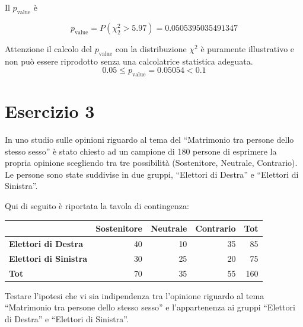 \documentclass[
  11pt,
]{book}
\theoremstyle{mytheoremstyle}
\theoremstyle{mydefstyle}
\newenvironment{sol}
  {
  \begin{tcolorbox}[enhanced,breakable,arc=0.1mm,boxrule=1pt,colback=white,colframe=iblue,
  title=\bf \fontfamily{lmss}\selectfont \hspace{.5 cm} Soluzione,drop fuzzy shadow]

}{
\end{tcolorbox}
  }
\begin{document}
\begin{sol}
Il \(p_{\text{value}}\) è

\[ p_{\text{value}} = P(\chi^2_{2}>5.97)=0.0505395035491347 \]

Attenzione il calcolo del \(p_\text{value}\) con la distribuzione \(\chi^2\) è puramente illustrativo e non può essere riprodotto senza una calcolatrice statistica adeguata.\[
 0.05 \leq p_\text{value}= 0.05054 < 0.1 
\]

\end{sol}

\section{Esercizio 3}\label{esercizio-3}

In uno studio sulle opinioni riguardo al tema del ``Matrimonio tra persone dello stesso sesso'' è stato chiesto ad un campione di 180 persone di esprimere la propria opinione scegliendo tra tre possibilità (Sostenitore, Neutrale, Contrario). Le persone sono state suddivise in due gruppi, ``Elettori di Destra'' e ``Elettori di Sinistra''.

Qui di seguito è riportata la tavola di contingenza:

\begin{table}[H]
\centering
\begin{tabular}{>{}lrrrr}
\toprule
  & Sostenitore & Neutrale & Contrario & Tot\\
\midrule
\textbf{Elettori di Destra} & 40 & 10 & 35 & 85\\
\textbf{Elettori di Sinistra} & 30 & 25 & 20 & 75\\
\textbf{Tot} & 70 & 35 & 55 & 160\\
\bottomrule
\end{tabular}
\end{table}

Testare l'ipotesi che vi sia indipendenza tra l'opinione riguardo al tema ``Matrimonio tra persone dello stesso sesso'' e l'appartenenza ai gruppi ``Elettori di Destra'' e ``Elettori di Sinistra''.
\end{document}
